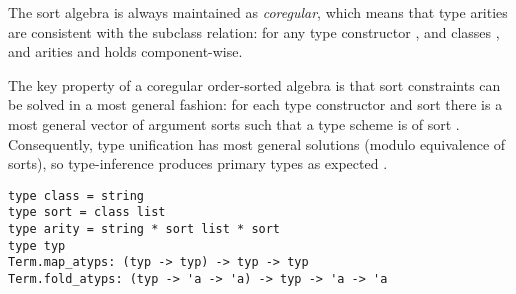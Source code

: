 \begin{isabellebody}
\begin{isamarkuptext}
  \medskip The sort algebra is always maintained as \emph{coregular},
  which means that type arities are consistent with the subclass
  relation: for any type constructor \isa{{\isasymkappa}}, and classes , and arities  and  holds  component-wise.

  The key property of a coregular order-sorted algebra is that sort
  constraints can be solved in a most general fashion: for each type
  constructor \isa{{\isasymkappa}} and sort  there is a most general
  vector of argument sorts  such
  that a type scheme  is of sort .
  Consequently, type unification has most general solutions (modulo
  equivalence of sorts), so type-inference produces primary types as
  expected \cite{nipkow-prehofer}.%
\end{isamarkuptext}%
\isamarkuptrue%
%
\isadelimmlref
%
\endisadelimmlref
%
\isatagmlref
%
\begin{isamarkuptext}%
\begin{mldecls}
  \verb|type class = string| \\
  \verb|type sort = class list| \\
  \verb|type arity = string * sort list * sort| \\
  \verb|type typ| \\
  \verb|Term.map_atyps: (typ -> typ) -> typ -> typ| \\
  \verb|Term.fold_atyps: (typ -> 'a -> 'a) -> typ -> 'a -> 'a| \\
  \end{mldecls}

\end{isamarkuptext}
\end{isabellebody}
